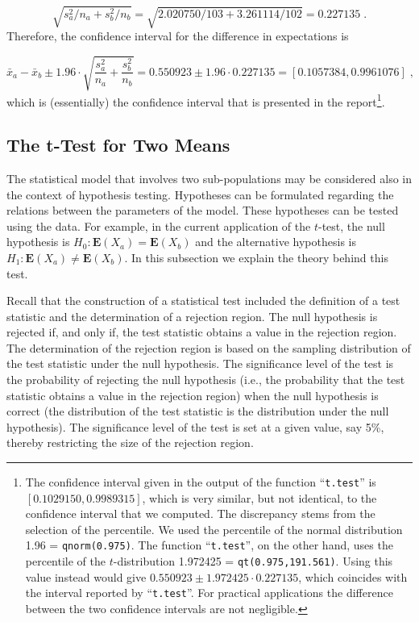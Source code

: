 \documentclass[
]{krantz}
\newcommand{\Expec}{\mathbf{E}}
\theoremstyle{definition}
\theoremstyle{definition}
\theoremstyle{definition}
\theoremstyle{remark}
\begin{document}
\[\sqrt{s_a^2/n_a + s_b^2/n_b} = \sqrt{2.020750/103 + 3.261114/102} = 0.227135\;.\]
Therefore, the confidence interval for the difference in expectations is

\[\bar x_a- \bar x_b \pm 1.96 \cdot \sqrt{\frac{s_a^2}{n_a} + \frac{s_b^2}{n_b}} = 0.550923 \pm 1.96 \cdot 0.227135 = [0.1057384,0.9961076]\;,\]
which is (essentially) the confidence interval that is presented in the
report\footnote{The confidence interval given in the output of the function
  ``\texttt{t.test}'' is \([0.1029150, 0.9989315]\), which is very similar, but
  not identical, to the confidence interval that we computed. The
  discrepancy stems from the selection of the percentile. We used the
  percentile of the normal distribution 1.96 = \texttt{qnorm(0.975)}. The
  function ``\texttt{t.test}'', on the other hand, uses the percentile of the
  \(t\)-distribution 1.972425 = \texttt{qt(0.975,191.561)}. Using this value
  instead would give \(0.550923 \pm 1.972425 \cdot 0.227135\), which
  coincides with the interval reported by ``\texttt{t.test}''. For practical
  applications the difference between the two confidence intervals are
  not negligible.}.

\hypertarget{the-t-test-for-two-means}{%
\subsection{The t-Test for Two Means}\label{the-t-test-for-two-means}}

The statistical model that involves two sub-populations may be
considered also in the context of hypothesis testing. Hypotheses can be
formulated regarding the relations between the parameters of the model.
These hypotheses can be tested using the data. For example, in the
current application of the \(t\)-test, the null hypothesis is
\(H_0: \Expec(X_a) = \Expec(X_b)\) and the alternative hypothesis is
\(H_1: \Expec(X_a) \not= \Expec(X_b)\). In this subsection we explain the
theory behind this test.

Recall that the construction of a statistical test included the
definition of a test statistic and the determination of a rejection
region. The null hypothesis is rejected if, and only if, the test
statistic obtains a value in the rejection region. The determination of
the rejection region is based on the sampling distribution of the test
statistic under the null hypothesis. The significance level of the test
is the probability of rejecting the null hypothesis (i.e., the
probability that the test statistic obtains a value in the rejection
region) when the null hypothesis is correct (the distribution of the
test statistic is the distribution under the null hypothesis). The
significance level of the test is set at a given value, say 5\%, thereby
restricting the size of the rejection region.
\end{document}

